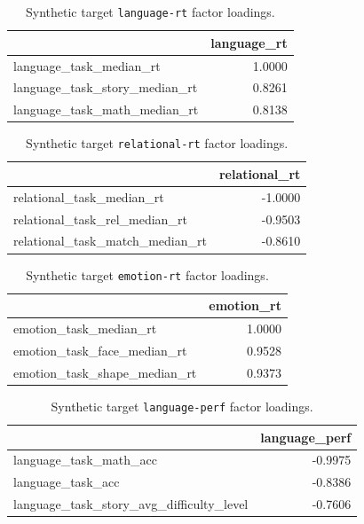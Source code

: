 \documentclass{article}
\begin{document}
\begin{table}[H]
\caption{Synthetic target \texttt{language-rt} factor loadings.}\label{tab:language-rt}
\centering
\begin{tabular}{lr}
\toprule
 & language\_rt \\
\midrule
language\_task\_median\_rt & 1.0000 \\
language\_task\_story\_median\_rt & 0.8261 \\
language\_task\_math\_median\_rt & 0.8138 \\
\bottomrule
\end{tabular}

\end{table}


\begin{table}[H]
\caption{Synthetic target \texttt{relational-rt} factor loadings.}\label{tab:relational-rt}
\centering
\begin{tabular}{lr}
\toprule
 & relational\_rt \\
\midrule
relational\_task\_median\_rt & -1.0000 \\
relational\_task\_rel\_median\_rt & -0.9503 \\
relational\_task\_match\_median\_rt & -0.8610 \\
\bottomrule
\end{tabular}

\end{table}


\begin{table}[H]
\caption{Synthetic target \texttt{emotion-rt} factor loadings.}\label{tab:emotion-rt}
\centering
\begin{tabular}{lr}
\toprule
 & emotion\_rt \\
\midrule
emotion\_task\_median\_rt & 1.0000 \\
emotion\_task\_face\_median\_rt & 0.9528 \\
emotion\_task\_shape\_median\_rt & 0.9373 \\
\bottomrule
\end{tabular}

\end{table}


\begin{table}[H]
\caption{Synthetic target \texttt{language-perf} factor loadings.}\label{tab:language-perf}
\centering
\begin{tabular}{lr}
\toprule
 & language\_perf \\
\midrule
language\_task\_math\_acc & -0.9975 \\
language\_task\_acc & -0.8386 \\
language\_task\_story\_avg\_difficulty\_level & -0.7606 \\
\bottomrule
\end{tabular}

\end{table}
\end{document}
